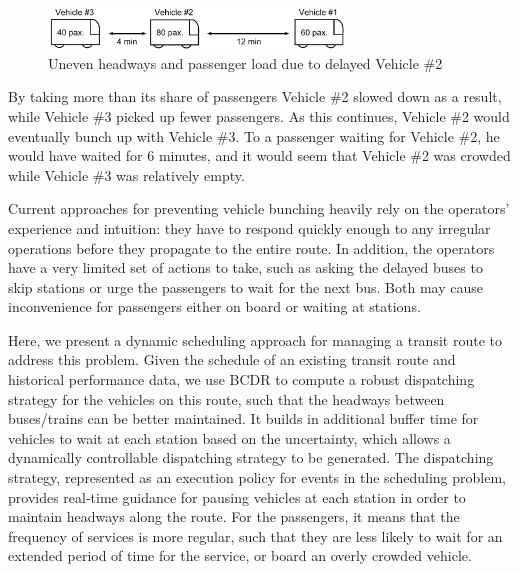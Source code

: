 \documentclass[jair,twoside,11pt,theapa]{article}
\begin{document}
\begin{figure}[htb]
	\centering
	\includegraphics[width=0.7\textwidth]{figures/MBTA/bunching2.pdf}
	\caption{Uneven headways and passenger load due to delayed Vehicle \#2}
	\label{fig:bus_bunching2}
\end{figure}


By taking more than its share of passengers Vehicle \#2 slowed down as a result,
while Vehicle \#3 picked up fewer passengers.
As this continues, Vehicle \#2 would eventually bunch up with Vehicle \#3. To a
passenger waiting for Vehicle \#2, he would have waited for 6 minutes, and it
would seem that Vehicle \#2 was crowded while Vehicle \#3 was relatively empty.


Current approaches for preventing vehicle bunching heavily rely on the
operators' experience and intuition: they have to respond quickly enough to any
irregular operations before they propagate to the entire route. In addition, the
operators have a very limited set of actions to take, such as asking the delayed
buses to skip stations or urge the passengers to wait for the next bus. Both may
cause inconvenience for passengers either on board or waiting at stations.


Here, we present a dynamic scheduling approach for managing a transit route to address this problem.
Given the schedule of an existing transit route and historical performance data,
we use BCDR to compute a robust dispatching strategy for the vehicles on
this route, such that the headways between buses/trains can be better
maintained. It builds in additional buffer time for vehicles to wait at each
station based on the uncertainty, which allows a dynamically controllable
dispatching strategy to be generated. The dispatching strategy, represented as an
execution policy for events in the scheduling problem, provides real-time
guidance for pausing vehicles at each station in order to maintain headways
along the route. For the passengers, it means that the frequency of services is
more regular, such that they are less likely to wait for an extended period of
time for the service, or board an overly crowded vehicle.
\end{document}

